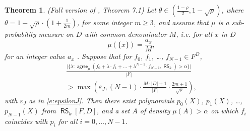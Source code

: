 \documentclass[11pt,article,oneside]{memoir}
\newtheorem{thm}{Theorem}[]
\theoremstyle{definition}
\theoremstyle{remark}
\DeclareMathOperator{\RS}{\mathsf{RS}}
\DeclareMathOperator{\agree}{\mathsf{agree}}
\begin{document}
\begin{thm}
(Full version of \cite{ProximityGaps}, Theorem 7.1) Let $\theta\in \left(\frac{1-\rho}{2},1-\sqrt\rho\right)$, where $\theta = 1-\sqrt\rho \cdot \left(1+\frac{1}{2m}\right)$, for some integer $m\geq 3$, and assume that $\mu$ is a sub-probability measure on $D$ with common denominator $M$, i.e. for all $x$ in $D$
\[
\mu(\{x\}) = \frac{a_x}{M},
\]
for an integer value $a_x$ . 
Suppose that for $f_0$, $f_1$, \ldots, $f_{N-1}\in F^D$, 
\begin{multline} 
\frac{
	\big|\big\{ \lambda : \agree_\mu(f_0 + \lambda\cdot f_1+ \ldots +\lambda^{N-1}\cdot f_{N-1}, \RS_k)>\alpha \big\}\big|
	}
	{|F|}
\\
> \max\left(\varepsilon_J, (N-1)\cdot \frac{M\cdot |D|+1}{|F|} \cdot \frac{2m+1}{\sqrt\rho} \right),
\end{multline}
with $\varepsilon_J$ as in \eqref{e:epsilonJ}.
Then there exist polynomials $p_0(X)$, $p_1(X)$, \ldots , $p_{N-1}(X)$ from $\RS_k[F,D]$, and a set $A$ of density $\mu(A)>\alpha$ on which $f_i$ coincides with $p_i$ for all $i=0,\ldots, N-1$. 
\end{thm}
\end{document}
